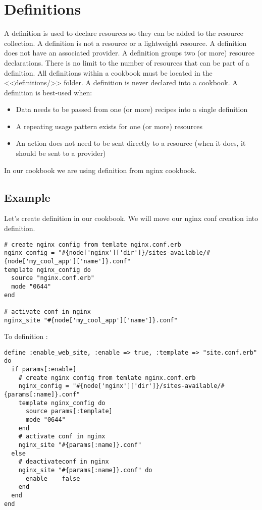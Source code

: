 \section{Definitions}

A definition is used to declare resources so they can be added to the resource collection. A definition is not a resource or a lightweight resource. A definition does not have an associated provider. A definition groups two (or more) resource declarations. There is no limit to the number of resources that can be part of a definition. All definitions within a cookbook must be located in the <<definitions/>> folder. A definition is never declared into a cookbook. A definition is best-used when:

\begin{itemize}
  \item Data needs to be passed from one (or more) recipes into a single definition
  \item A repeating usage pattern exists for one (or more) resources
  \item An action does not need to be sent directly to a resource (when it does, it should be sent to a provider)
\end{itemize}

In our  cookbook we are using  definition from nginx cookbook.

\subsection{Example}

Let's create definition in our  cookbook. We will move our nginx conf creation into definition.

\begin{lstlisting}[label=lst:cookbook-definitions-default1,title=my-server-cloud/site-cookbooks/my\_cool\_app/recipes/default.rb]
# create nginx config from temlate nginx.conf.erb
nginx_config = "#{node['nginx']['dir']}/sites-available/#{node['my_cool_app']['name']}.conf"
template nginx_config do
  source "nginx.conf.erb"
  mode "0644"
end

# activate conf in nginx
nginx_site "#{node['my_cool_app']['name']}.conf"
\end{lstlisting}

To definition :

\begin{lstlisting}[label=lst:cookbook-definitions-enable-site,title=my-server-cloud/site-cookbooks/my\_cool\_app/definitions/enable\_web\_site.rb]
define :enable_web_site, :enable => true, :template => "site.conf.erb" do
  if params[:enable]
    # create nginx config from temlate nginx.conf.erb
    nginx_config = "#{node['nginx']['dir']}/sites-available/#{params[:name]}.conf"
    template nginx_config do
      source params[:template]
      mode "0644"
    end
    # activate conf in nginx
    nginx_site "#{params[:name]}.conf"
  else
    # deactivateconf in nginx
    nginx_site "#{params[:name]}.conf" do
      enable    false
    end
  end
end
\end{lstlisting}


